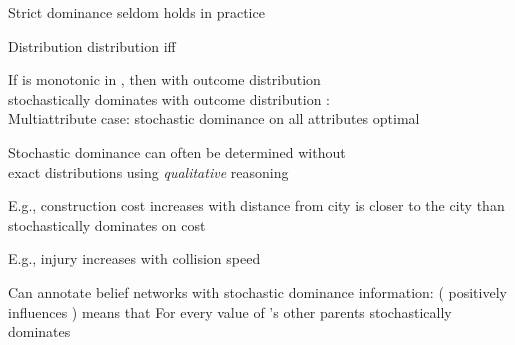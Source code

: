 \documentclass{article}
\begin{document}
\begin{huge}
\textwidth
{}

Strict dominance seldom holds in practice




Distribution   distribution  iff\nl

If  is monotonic in , then  with outcome distribution \\
stochastically dominates  with outcome distribution :\nl
  \\
Multiattribute case: stochastic dominance on all attributes \mat{$\implies$} optimal




Stochastic dominance can often be determined without\\
exact distributions using \emph{qualitative} reasoning

E.g., construction cost increases with distance from city\nl
       is closer to the city than \al
  \mat{$\implies$}  stochastically dominates  on cost

E.g., injury increases with collision speed

Can annotate belief networks with stochastic dominance information:\al
   ( positively influences ) means that\al
  For every value  of 's other parents \nl
     stochastically dominates 



\vspace*{0.1in}

\textwidth
{}



\end{huge}
\end{document}
